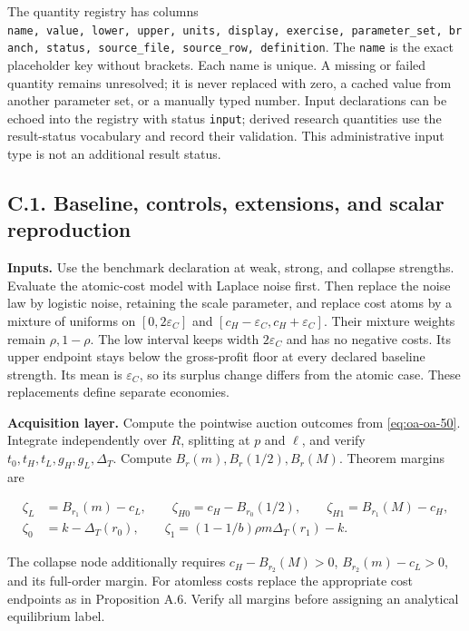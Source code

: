 \documentclass[
  11pt,
]{article}
\begin{document}
The quantity registry has columns
\texttt{name,\ value,\ lower,\ upper,\ units,\ display,\ exercise,\ parameter\_set,\ branch,\ status,\ source\_file,\ source\_row,\ definition}.
The \texttt{name} is the exact placeholder key without brackets. Each
name is unique. A missing or failed quantity remains unresolved; it is
never replaced with zero, a cached value from another parameter set, or
a manually typed number. Input declarations can be echoed into the
registry with status \texttt{input}; derived research quantities use the
result-status vocabulary and record their validation. This
administrative input type is not an additional result status.

\subsection{C.1. Baseline, controls, extensions, and scalar
reproduction}\label{oa-c-baseline}

\textbf{Inputs.} Use the benchmark declaration at weak, strong, and
collapse strengths. Evaluate the atomic-cost model with Laplace noise
first. Then replace the noise law by logistic noise, retaining the scale
parameter, and replace cost atoms by a mixture of uniforms on
\([0,2\varepsilon_C]\) and \([c_H-\varepsilon_C,c_H+\varepsilon_C]\).
Their mixture weights remain \(\rho,1-\rho\). The low interval keeps
width \(2\varepsilon_C\) and has no negative costs. Its upper endpoint
stays below the gross-profit floor at every declared baseline strength.
Its mean is \(\varepsilon_C\), so its surplus change differs from the
atomic case. These replacements define separate economies.

\textbf{Acquisition layer.} Compute the pointwise auction outcomes from
\eqref{eq:oa-oa-50}. Integrate independently over \(R\), splitting at
\(p\) and \(\ell\), and verify \(t_0,t_H,t_L,g_H,g_L,\Delta_T\). Compute
\(B_r(m),B_r(1/2),B_r(M)\). Theorem margins are

\[
\begin{aligned}
\zeta_L&=B_{r_1}(m)-c_L,\qquad
\zeta_{H0}=c_H-B_{r_0}(1/2),\qquad
\zeta_{H1}=B_{r_1}(M)-c_H,\\
\zeta_0&=k-\Delta_T(r_0),\qquad
\zeta_1=(1-1/b)\rho m\Delta_T(r_1)-k.
\end{aligned}
\tag{OA.77}\label{eq:oa-oa-77}
\]

The collapse node additionally requires \(c_H-B_{r_2}(M)>0\),
\(B_{r_2}(m)-c_L>0\), and its full-order margin. For atomless costs
replace the appropriate cost endpoints as in Proposition A.6. Verify all
margins before assigning an analytical equilibrium label.
\end{document}
